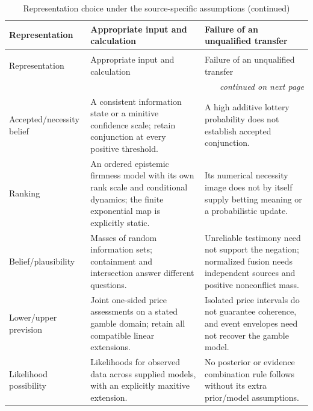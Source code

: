 \begin{longtable}{@{}p{.20\linewidth}p{.34\linewidth}p{.38\linewidth}@{}}
\caption{Representation choice under the source-specific assumptions.}
\label{tab:p15-r47-choice}\\
\toprule Representation & Appropriate input and calculation & Failure of an unqualified transfer \\
\midrule\endfirsthead
\caption[]{Representation choice under the source-specific assumptions (continued)}\\
\toprule Representation & Appropriate input and calculation & Failure of an unqualified transfer \\
\midrule\endhead
\midrule\multicolumn{3}{r}{\emph{continued on next page}}\\
\endfoot
\endlastfoot
Accepted/necessity belief & A consistent information state or a minitive
confidence scale; retain conjunction at every positive threshold. & A high
additive lottery probability does not establish accepted conjunction. \\
Ranking & An ordered epistemic firmness model with its own rank scale and
conditional dynamics; the finite exponential map is explicitly static. &
Its numerical necessity image does not by itself supply betting meaning
or a probabilistic update. \\
Belief/plausibility & Masses of random information sets; containment and
intersection answer different questions. & Unreliable testimony need not
support the negation; normalized fusion needs independent sources and
positive nonconflict mass. \\
Lower/upper prevision & Joint one-sided price assessments on a stated
gamble domain; retain all compatible linear extensions. & Isolated price
intervals do not guarantee coherence, and event envelopes need not recover
the gamble model. \\
Likelihood possibility & Likelihoods for observed data across supplied
models, with an explicitly maxitive extension. & No posterior or evidence
combination rule follows without its extra prior/model assumptions. \\
\bottomrule\end{longtable}

